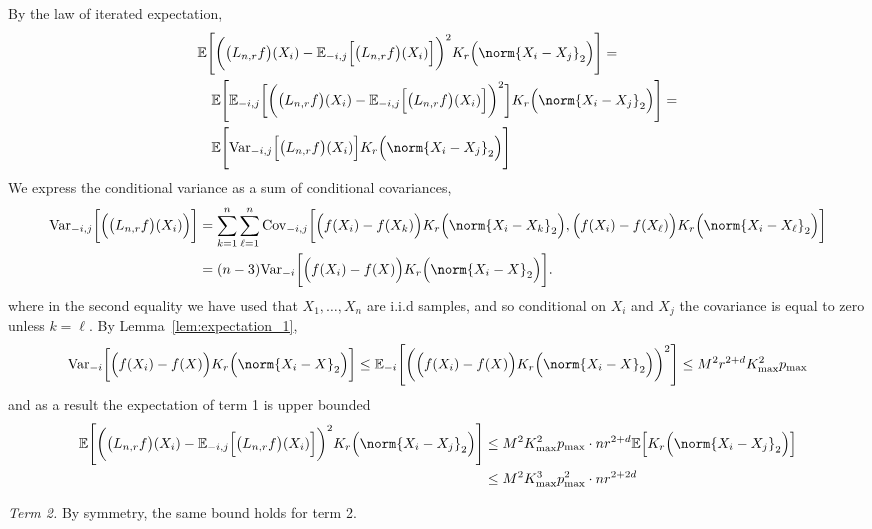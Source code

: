 \documentclass{article}
\newcommand{\Var}{\mathrm{Var}}
\newcommand{\Cov}{\mathrm{Cov}}
\newcommand{\1}{\mathbf{1}}
\newcommand{\Ebb}{\mathbb{E}}
\theoremstyle{alden}
\theoremstyle{aldenthm}
\theoremstyle{definition}
\theoremstyle{remark}
\begin{document}
By the law of iterated expectation,
\begin{align*}
& \Ebb \Biggl[\biggl(\bigl(L_{n,r}f\bigr)(X_i) - \Ebb_{-i,j}\Bigl[\bigl(L_{n,r}f\bigr)(X_i)\Bigr]\biggr)^2 K_r\Bigl(\norm{X_i - X_j}_2\Bigr)\Biggr] = \\
& ~~~ \Ebb \Biggl[ \Ebb_{-i,j}\biggl[ \biggl(\bigl(L_{n,r}f\bigr)(X_i) - \Ebb_{-i,j}\Bigl[\bigl(L_{n,r}f\bigr)(X_i)\Bigr]\biggr)^2 \biggr]   K_r\Bigl(\norm{X_i - X_j}_2\Bigr)\Biggr] = \\
& ~~~ \Ebb \Biggl[ \Var_{-i,j}\Bigl[\bigl(L_{n,r}f\bigr)(X_i) \Bigr]   K_r\Bigl(\norm{X_i - X_j}_2\Bigr)\Biggr]
\end{align*}
We express the conditional variance as a sum of conditional covariances,
\begin{align*}
\Var_{-i,j}\biggl[ \Bigl(\bigl(L_{n,r}f\bigr)(X_i)\Bigr) \biggr] & = \sum_{k = 1}^{n} \sum_{\ell = 1}^{n} \Cov_{-i,j}\biggl[\Bigl(f(X_i) - f(X_k)\Bigr)K_r\Bigl(\norm{X_i - X_k}_2\Bigr), \Bigl(f(X_i) - f(X_{\ell})\Bigr)K_r\Bigl(\norm{X_i - X_{\ell}}_2\Bigr)\biggr] \\
& = (n - 3) \Var_{-i}\biggl[\Bigl(f(X_i) - f(X)\Bigr)K_r\Bigl(\norm{X_i - X}_2\Bigr)\biggr].
\end{align*}
where in the second equality we have used that $X_1,\ldots,X_n$ are i.i.d samples, and so conditional on $X_i$ and $X_j$ the covariance is equal to zero unless $k = \ell$. By Lemma~\ref{lem:expectation_1},
\begin{align*}
\Var_{-i}\biggl[\Bigl(f(X_i) - f(X)\Bigr)K_r\Bigl(\norm{X_i - X}_2\Bigr)\biggr] \leq \Ebb_{-i}\Biggl[\biggl(\Bigl(f(X_i) - f(X)\Bigr)K_r\Bigl(\norm{X_i - X}_2\Bigr)\biggr)^2\Biggr] \leq M^2 r^{2+d}K_{\max}^2 p_{\max}
\end{align*}
and as a result the expectation of term 1 is upper bounded
\begin{align*}
\Ebb \Biggl[\biggl(\bigl(L_{n,r}f\bigr)(X_i) - \Ebb_{-i,j}\Bigl[\bigl(L_{n,r}f\bigr)(X_i)\Bigr]\biggr)^2 K_r\Bigl(\norm{X_i - X_j}_2\Bigr)\Biggr] & \leq M^2K_{\max}^2 p_{\max} \cdot nr^{2 + d} \Ebb\Bigl[K_r\Bigl(\norm{X_i - X_j}_2\Bigr)\Bigr] \\
& \leq M^2K_{\max}^3 p_{\max}^2 \cdot nr^{2 + 2d}
\end{align*} 

\textit{Term 2.}
By symmetry, the same bound holds for term 2.
\end{document}
